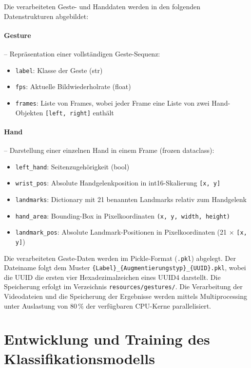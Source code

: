 Die verarbeiteten Geste- und Handdaten werden in den folgenden Datenstrukturen abgebildet:

\paragraph{Gesture} -- Repräsentation einer vollständigen Geste-Sequenz:
\begin{itemize}
    \item \texttt{label}: Klasse der Geste (str)
    \item \texttt{fps}: Aktuelle Bildwiederholrate (float)
    \item \texttt{frames}: Liste von Frames, wobei jeder Frame eine Liste von zwei Hand-Objekten \texttt{[left, right]} enthält
\end{itemize}

\paragraph{Hand} -- Darstellung einer einzelnen Hand in einem Frame (frozen dataclass):
\begin{itemize}
    \item \texttt{left\_hand}: Seitenzugehörigkeit (bool)
    \item \texttt{wrist\_pos}: Absolute Handgelenkposition in int16-Skalierung \texttt{[x, y]}
    \item \texttt{landmarks}: Dictionary mit 21 benannten Landmarks relativ zum Handgelenk
    \item \texttt{hand\_area}: Bounding-Box in Pixelkoordinaten \texttt{(x, y, width, height)}
    \item \texttt{landmark\_pos}: Absolute Landmark-Positionen in Pixelkoordinaten (21 $\times$ \texttt{[x, y]})
\end{itemize}

Die verarbeiteten Geste-Daten werden im Pickle-Format (\texttt{.pkl}) abgelegt. Der Dateiname folgt dem Muster \texttt{\{Label\}\_\{Augmentierungstyp\}\_\{UUID\}.pkl}, wobei die UUID die ersten vier Hexadezimalzeichen eines UUID4 darstellt. Die Speicherung erfolgt im Verzeichnis \texttt{resources/gestures/}. Die Verarbeitung der Videodateien und die Speicherung der Ergebnisse werden mittels Multiprocessing unter Auslastung von 80\,\% der verfügbaren CPU-Kerne parallelisiert.

\section{Entwicklung und Training des Klassifikationsmodells}
